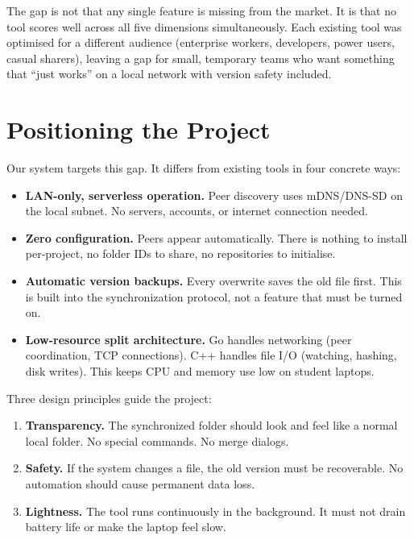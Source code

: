 The gap is not that any single feature is missing from the market. It is that no tool scores well across all five dimensions simultaneously. Each existing tool was optimised for a different audience (enterprise workers, developers, power users, casual sharers), leaving a gap for small, temporary teams who want something that ``just works'' on a local network with version safety included.

\section{Positioning the Project}

Our system targets this gap. It differs from existing tools in four concrete ways:

\begin{itemize}
    \item \textbf{LAN-only, serverless operation.} Peer discovery uses mDNS/DNS-SD on the local subnet. No servers, accounts, or internet connection needed.
    \item \textbf{Zero configuration.} Peers appear automatically. There is nothing to install per-project, no folder IDs to share, no repositories to initialise.
    \item \textbf{Automatic version backups.} Every overwrite saves the old file first. This is built into the synchronization protocol, not a feature that must be turned on.
    \item \textbf{Low-resource split architecture.} Go handles networking (peer coordination, TCP connections). C++ handles file I/O (watching, hashing, disk writes). This keeps CPU and memory use low on student laptops.
\end{itemize}

Three design principles guide the project:

\begin{enumerate}
    \item \textbf{Transparency.} The synchronized folder should look and feel like a normal local folder. No special commands. No merge dialogs.
    \item \textbf{Safety.} If the system changes a file, the old version must be recoverable. No automation should cause permanent data loss.
    \item \textbf{Lightness.} The tool runs continuously in the background. It must not drain battery life or make the laptop feel slow.
\end{enumerate}

